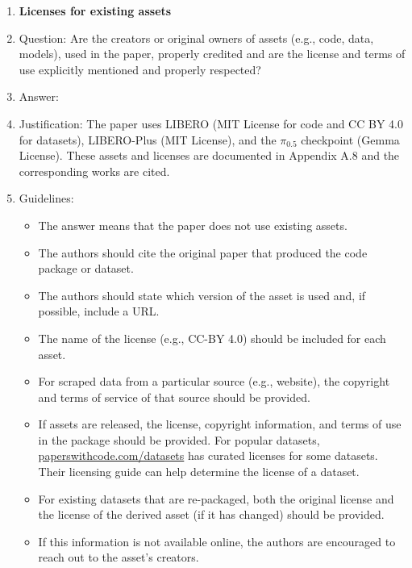 \documentclass{article}
\begin{document}
\begin{enumerate}
\item {\bf Licenses for existing assets}
    \item[] Question: Are the creators or original owners of assets (e.g., code, data, models), used in the paper, properly credited and are the license and terms of use explicitly mentioned and properly respected?
    \item[] Answer: \answerYes{} %
    \item[] Justification: The paper uses LIBERO (MIT License for code and CC BY 4.0 for datasets), LIBERO-Plus (MIT License), and the $\pi_{0.5}$ checkpoint (Gemma License). These assets and licenses are documented in Appendix A.8 and the corresponding works are cited.
    \item[] Guidelines:
    \begin{itemize}
        \item The answer \answerNA{} means that the paper does not use existing assets.
        \item The authors should cite the original paper that produced the code package or dataset.
        \item The authors should state which version of the asset is used and, if possible, include a URL.
        \item The name of the license (e.g., CC-BY 4.0) should be included for each asset.
        \item For scraped data from a particular source (e.g., website), the copyright and terms of service of that source should be provided.
        \item If assets are released, the license, copyright information, and terms of use in the package should be provided. For popular datasets, \url{paperswithcode.com/datasets} has curated licenses for some datasets. Their licensing guide can help determine the license of a dataset.
        \item For existing datasets that are re-packaged, both the original license and the license of the derived asset (if it has changed) should be provided.
        \item If this information is not available online, the authors are encouraged to reach out to the asset's creators.
    \end{itemize}


\end{enumerate}
\end{document}
